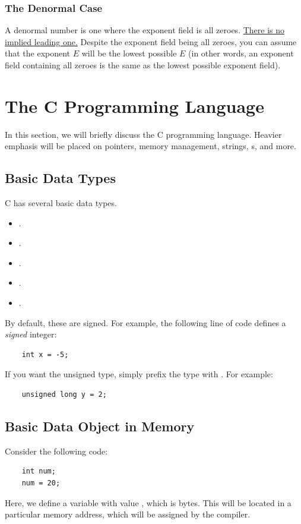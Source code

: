 \documentclass[letterpaper]{article}
\begin{document}
\subsubsection{The Denormal Case}
A denormal number is one where the exponent field is all zeroes. \underline{There is no implied leading one.} Despite the exponent field being all zeroes, you can assume that the exponent $E$ will be the lowest possible $E$ (in other words, an exponent field containing all zeroes is the same as the lowest possible exponent field). 


\newpage 

\section{The \textbf{C} Programming Language}
In this section, we will briefly discuss the C programming language. Heavier emphasis will be placed on pointers, memory management, strings, s, and more. 


\subsection{Basic Data Types}
C has several basic data types.
\begin{itemize}
    \item {}.
    \item {}.
    \item {}.
    \item {}.
    \item {}.
\end{itemize}
By default, these are signed. For example, the following line of code defines a \emph{signed} integer:
\begin{verbatim}
    int x = -5;
\end{verbatim}
If you want the unsigned type, simply prefix the type with . For example:
\begin{verbatim}
    unsigned long y = 2;
\end{verbatim}

\subsection{Basic Data Object in Memory}
Consider the following code:
\begin{verbatim}
    int num; 
    num = 20;
\end{verbatim}
Here, we define a variable  with value , which is  bytes. This will be located in a particular memory address, which will be assigned by the compiler.
\end{document}
